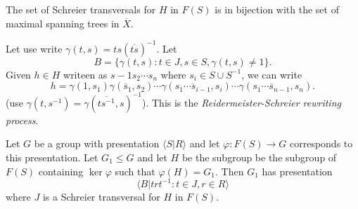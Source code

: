 \documentclass[a4paper]{article}
\begin{document}
\begin{remark}
  The set of Schreier transversals for \(H\) in \(F(S)\) is in bijection with the set of maximal spanning trees in \(\overline X\).
\end{remark}

Let use write \(\gamma(t, s) = ts(\overline{ts})^{-1}\). Let
\[
  B = \{\gamma(t, s): t \in J, s \in S, \gamma(t, s) \ne 1\}.
\]
Given \(h \in H\) writeen as \(s-1s_2 \cdots s_n\) where \(s_i \in S \cup S^{-1}\), we can write
\[
  h = \gamma(1, s_1) \gamma(\overline s_1, s_2) \cdots \gamma(\overline{s_1 \cdots s_{i - 1}}, s_i) \cdots \gamma(\overline{s_1 \cdots s_{n - 1}}, s_n).
\]
(use \(\gamma(t, s^{-1}) = \gamma(\overline{ts^{-1}}, s)^{-1}\)).
This is the \emph{Reidermeister-Schreier rewriting process}.

\begin{theorem}
  Let \(G\) be a group with presentation \(\langle S| R\rangle\) and let \(\varphi: F(S) \to G\) corresponds to this presentation. Let \(G_1 \leq G\) and let \(H\) be the subgroup be the subgroup of \(F(S)\) containing \(\ker \varphi\) such that \(\varphi(H) = G_1\). Then \(G_1\) has presentation
  \[
    \langle B| trt^{-1}: t \in J, r \in R \rangle
  \]
  where \(J\) is a Schreier transversal for \(H\) in \(F(S)\).
\end{theorem}




\printindex
\end{document}
